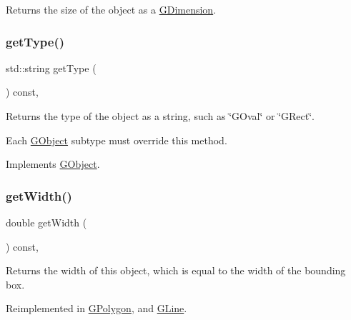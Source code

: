 Returns the size of the object as a {\ttfamily \mbox{\hyperlink{structsgl_1_1GDimension}{G\+Dimension}}}. 

\mbox{\label{classsgl_1_1GCompound_a9b72ede4ee8520f987a0c01e30654814}} 
\subsubsection{\texorpdfstring{get\+Type()}{getType()}}
{\footnotesize\ttfamily std\+::string get\+Type (\begin{DoxyParamCaption}{ }\end{DoxyParamCaption}) const\hspace{0.3cm}{\ttfamily [override]}, {\ttfamily [virtual]}}



Returns the type of the object as a string, such as {\ttfamily \char`\"{}\+G\+Oval\char`\"{}} or {\ttfamily \char`\"{}\+G\+Rect\char`\"{}}. 

Each \mbox{\hyperlink{classsgl_1_1GObject}{G\+Object}} subtype must override this method. 

Implements \mbox{\hyperlink{classsgl_1_1GObject_a799e073a127b428cc841086d42ea4fed}{G\+Object}}.

\mbox{\label{classsgl_1_1GObject_a0ed2965abd4f5701d2cadf71239faf19}} 
\subsubsection{\texorpdfstring{get\+Width()}{getWidth()}}
{\footnotesize\ttfamily double get\+Width (\begin{DoxyParamCaption}{ }\end{DoxyParamCaption}) const\hspace{0.3cm}{\ttfamily [virtual]}, {\ttfamily [inherited]}}



Returns the width of this object, which is equal to the width of the bounding box. 



Reimplemented in \mbox{\hyperlink{classsgl_1_1GPolygon_ab7b172cec7ed45e1246a3ce3160a62f7}{G\+Polygon}}, and \mbox{\hyperlink{classsgl_1_1GLine_ab7b172cec7ed45e1246a3ce3160a62f7}{G\+Line}}.

